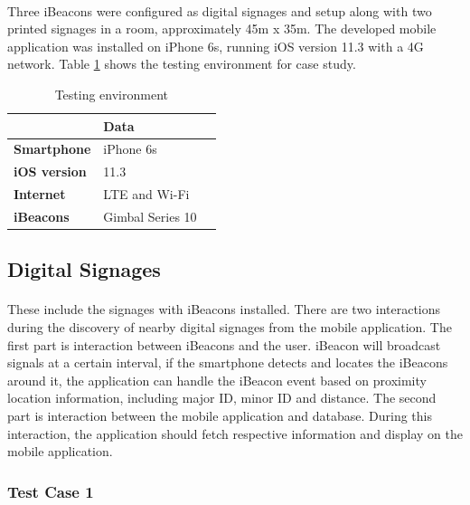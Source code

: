 \documentclass[12pt]{article}
\begin{document}
\paragraph{}Three iBeacons were configured as digital signages and setup along
with two printed signages in a room, approximately 45m x 35m. The developed mobile application was installed on iPhone 6s, running iOS version 11.3 with a 4G network. Table \ref{my-test} shows the testing environment for case study.

\begin{table}%
    \centering
    
    \label{my-test}
       \begin{tabular}{|p{30mm}|p{55mm}|p{35mm}|}
 \hline
  & \textbf{Data}  \\ [0.5ex] 
 \hline\hline
 \textbf{Smartphone} & iPhone 6s \\
 \hline
  \textbf {iOS version} & 11.3 \\
 \hline
 \textbf{Internet} & LTE  and Wi-Fi \\
 \hline
 \textbf{iBeacons} & Gimbal  Series 10  \\
 \hline
 
    \end{tabular}
    \caption{Testing environment } 
\end{table}

\subsection{Digital Signages }

\paragraph{}These include the signages with iBeacons installed. There are two interactions during the discovery of nearby digital signages from the mobile application. The first part is interaction between iBeacons and the user. iBeacon will broadcast signals at a certain interval, if the smartphone detects and locates the iBeacons around it,  the application can handle the iBeacon event based on proximity location information, including major ID, minor ID and distance. The second part is interaction between the mobile application and database. During this interaction, the application should fetch respective information and display on the mobile application.

\subsubsection{Test Case 1}
\label{oneone}
\end{document}
